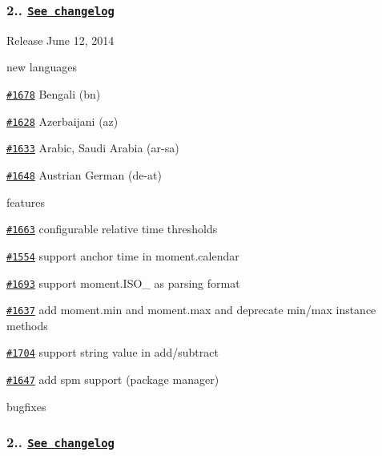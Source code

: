 \subsubsection*{2.. \href{https://gist.github.com/ichernev/b0a3d456d5a84c9901d7}{\tt See changelog}}


\begin{DoxyItemize}
\item Release June 12, 2014
\item new languages
\begin{DoxyItemize}
\item \href{https://github.com/moment/moment/issues/1678}{\tt \#1678} Bengali (bn)
\item \href{https://github.com/moment/moment/issues/1628}{\tt \#1628} Azerbaijani (az)
\item \href{https://github.com/moment/moment/issues/1633}{\tt \#1633} Arabic, Saudi Arabia (ar-\/sa)
\item \href{https://github.com/moment/moment/issues/1648}{\tt \#1648} Austrian German (de-\/at)
\end{DoxyItemize}
\item features
\begin{DoxyItemize}
\item \href{https://github.com/moment/moment/issues/1663}{\tt \#1663} configurable relative time thresholds
\item \href{https://github.com/moment/moment/issues/1554}{\tt \#1554} support anchor time in moment.\+calendar
\item \href{https://github.com/moment/moment/issues/1693}{\tt \#1693} support moment.\+I\+S\+O\+\_ as parsing format
\item \href{https://github.com/moment/moment/issues/1637}{\tt \#1637} add moment.\+min and moment.\+max and deprecate min/max instance methods
\item \href{https://github.com/moment/moment/issues/1704}{\tt \#1704} support string value in add/subtract
\item \href{https://github.com/moment/moment/issues/1647}{\tt \#1647} add spm support (package manager)
\end{DoxyItemize}
\item bugfixes
\end{DoxyItemize}

\subsubsection*{2.. \href{https://gist.github.com/ichernev/10544682}{\tt See changelog}}


